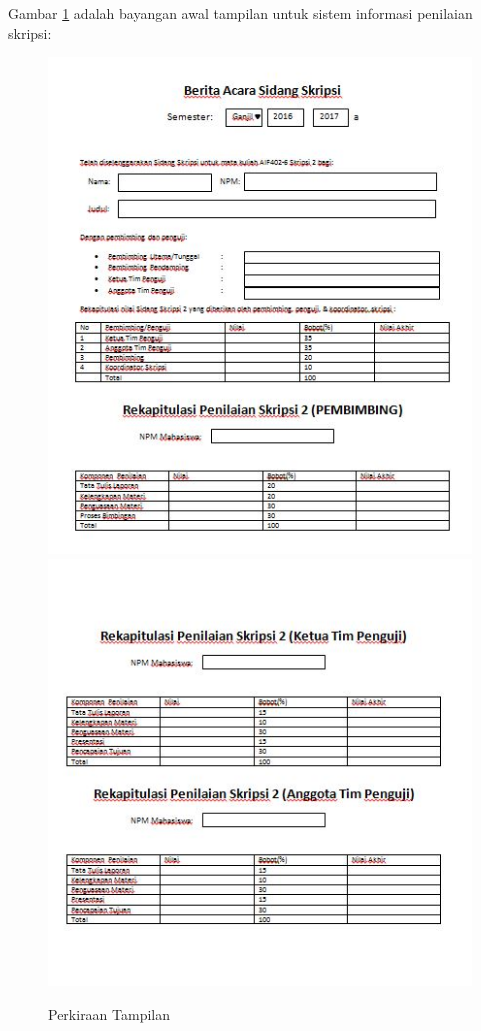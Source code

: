 	Gambar \ref{fig:tampilan} adalah bayangan awal tampilan untuk sistem informasi penilaian skripsi:
	\begin{figure}[H]
		\centering
		\includegraphics[scale=0.75]{Gambar/tampilan1}
		\includegraphics[scale=0.75]{Gambar/tampilan2}
		\caption{Perkiraan Tampilan}
		\label{fig:tampilan}
	\end{figure}
	
